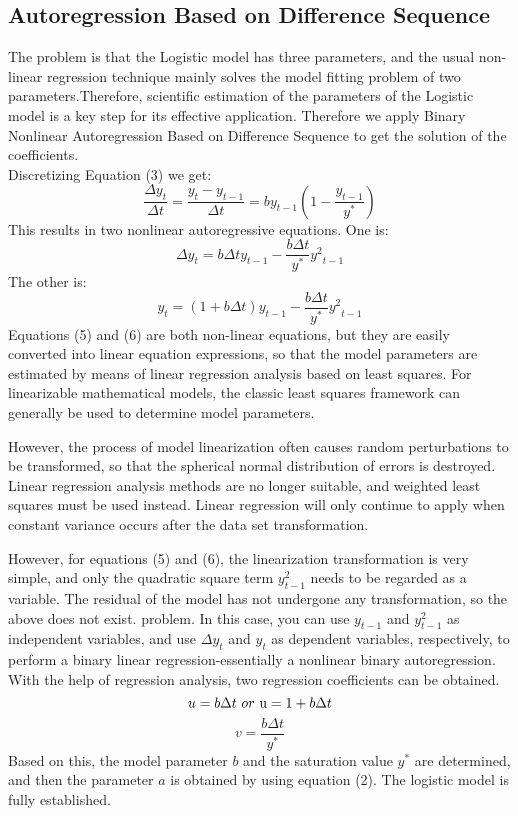 \documentclass[12pt]{article}  %
\begin{document}
\subsection{Autoregression Based on Difference Sequence}
The problem is that the Logistic model has three parameters, and the usual non-linear regression technique mainly solves the model fitting problem of two parameters.Therefore, scientific estimation of the parameters of the Logistic model is a key step for its effective application. Therefore we apply Binary Nonlinear Autoregression Based on Difference Sequence to get the solution of the coefficients.
\\Discretizing Equation (3) we get:
\begin{equation}
	{\frac{{\Delta {y_t}}}{{\Delta t}} = \frac{{{y_t} - {y_{t - 1}}}}{{\Delta t}} = b{y_{t - 1}}(1 - \frac{{{y_{t - 1}}}}{{{y^*}}})}
\end{equation}
This results in two nonlinear autoregressive equations. One is:
\begin{equation}
	{\Delta {y_t} = b\Delta t{y_{t - 1}} - \frac{{b\Delta t}}{{{y^*}}}{y^2}_{t - 1}}
\end{equation}
The other is:
\begin{equation}
	{{y_t} = (1 + b\Delta t){y_{t - 1}} - \frac{{b\Delta t}}{{{y^*}}}{y^2}_{t - 1}}
\end{equation}
Equations (5) and (6) are both non-linear equations, but they are easily converted into linear equation expressions, so that the model parameters are estimated by means of linear regression analysis based on least squares. For linearizable mathematical models, the classic least squares framework can generally be used to determine model parameters.

However, the process of model linearization often causes random perturbations to be transformed, so that the spherical normal distribution of errors is destroyed. Linear regression analysis methods are no longer suitable, and weighted least squares must be used instead. Linear regression will only continue to apply when constant variance occurs after the data set transformation.

However, for equations (5) and (6), the linearization transformation is very simple, and only the quadratic square term ${y_{t-1}^{2}}$ needs to be regarded as a variable. The residual of the model has not undergone any transformation, so the above does not exist. problem. In this case, you can use ${y_{t-1}}$ and ${y_{t-1}^{2}}$ as independent variables, and use ${\Delta y_{t}}$ and ${y_{t}}$ as dependent variables, respectively, to perform a binary linear regression-essentially a nonlinear binary autoregression. With the help of regression analysis, two regression coefficients can be obtained.
\begin{equation}
	{u = b\Delta t\		 or\	 {\rm{u}} = 1 + b\Delta t}
\end{equation}
\begin{equation}
	{v = \frac{{b\Delta t}}{{{y^*}}}}
\end{equation}
Based on this, the model parameter ${b}$ and the saturation value ${y^*}$ are determined, and then the parameter ${a}$ is obtained by using equation (2). The logistic model is fully established.
\end{document}
